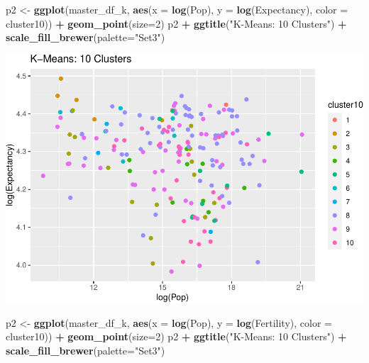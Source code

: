 \documentclass[]{article}
\newenvironment{Shaded}{\begin{snugshade}}{\end{snugshade}}
\newcommand{\DataTypeTok}[1]{\textcolor[rgb]{0.13,0.29,0.53}{#1}}
\newcommand{\DecValTok}[1]{\textcolor[rgb]{0.00,0.00,0.81}{#1}}
\newcommand{\KeywordTok}[1]{\textcolor[rgb]{0.13,0.29,0.53}{\textbf{#1}}}
\newcommand{\NormalTok}[1]{#1}
\newcommand{\OperatorTok}[1]{\textcolor[rgb]{0.81,0.36,0.00}{\textbf{#1}}}
\newcommand{\StringTok}[1]{\textcolor[rgb]{0.31,0.60,0.02}{#1}}
\begin{document}
\begin{Shaded}
\begin{Highlighting}[]
\NormalTok{p2 <-}\StringTok{ }\KeywordTok{ggplot}\NormalTok{(master_df_k, }\KeywordTok{aes}\NormalTok{(}\DataTypeTok{x =} \KeywordTok{log}\NormalTok{(Pop), }\DataTypeTok{y =} \KeywordTok{log}\NormalTok{(Expectancy), }\DataTypeTok{color =}\NormalTok{ cluster10)) }\OperatorTok{+}
\StringTok{  }\KeywordTok{geom_point}\NormalTok{(}\DataTypeTok{size=}\DecValTok{2}\NormalTok{)}
\NormalTok{p2 }\OperatorTok{+}\StringTok{ }\KeywordTok{ggtitle}\NormalTok{(}\StringTok{"K-Means: 10 Clusters"}\NormalTok{) }\OperatorTok{+}\StringTok{ }\KeywordTok{scale_fill_brewer}\NormalTok{(}\DataTypeTok{palette=}\StringTok{"Set3"}\NormalTok{)}
\end{Highlighting}
\end{Shaded}

\includegraphics{eda_files/figure-latex/unnamed-chunk-29-6.pdf}

\begin{Shaded}
\begin{Highlighting}[]
\NormalTok{p2 <-}\StringTok{ }\KeywordTok{ggplot}\NormalTok{(master_df_k, }\KeywordTok{aes}\NormalTok{(}\DataTypeTok{x =} \KeywordTok{log}\NormalTok{(Pop), }\DataTypeTok{y =} \KeywordTok{log}\NormalTok{(Fertility), }\DataTypeTok{color =}\NormalTok{ cluster10)) }\OperatorTok{+}
\StringTok{  }\KeywordTok{geom_point}\NormalTok{(}\DataTypeTok{size=}\DecValTok{2}\NormalTok{)}
\NormalTok{p2 }\OperatorTok{+}\StringTok{ }\KeywordTok{ggtitle}\NormalTok{(}\StringTok{"K-Means: 10 Clusters"}\NormalTok{) }\OperatorTok{+}\StringTok{ }\KeywordTok{scale_fill_brewer}\NormalTok{(}\DataTypeTok{palette=}\StringTok{"Set3"}\NormalTok{)}
\end{Highlighting}
\end{Shaded}
\end{document}
